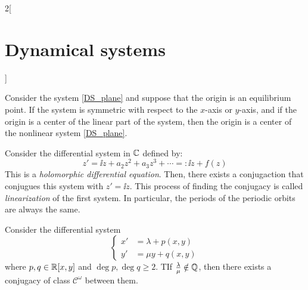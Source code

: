 \documentclass[../../../main_math.tex]{subfiles}
\begin{document}
\begin{multicols}{2}[\section{Dynamical systems}]
  \begin{theorem}
    Consider the system \cref{DS_plane} and suppose that the origin is an equilibrium point. If the system is symmetric with respect to the $x$-axis or $y$-axis, and if the origin is a center of the linear part of the system, then the origin is a center of the nonlinear system \cref{DS_plane}.
  \end{theorem}
  \begin{theorem}
    Consider the differential system in $\mathbb{C}$ defined by:
    $$z'=\ii z+ a_2z^2+a_3z^3+\cdots=:\ii z+f(z)$$ This is a \emph{holomorphic differential equation}. Then, there exists a conjugaction that conjugues this system with $z'=\ii z$. This process of finding the conjugacy is called \emph{linearization} of the first system. In particular, the periods of the periodic orbits are always the same.
  \end{theorem}
  \begin{theorem}
    Consider the differential system
    $$
      \left\{
      \begin{aligned}
        {x}' & = \lambda + p(x,y) \\
        {y}' & = \mu y+ q(x,y)
      \end{aligned}
      \right.
    $$
    where $p,q\in\mathbb{R}[x,y]$ and $\deg p,\deg q\geq 2$. TIf $\frac{\lambda}{\mu}\notin\mathbb{Q}$, then there exists a conjugacy of class $\mathcal{C}^\omega$ between them.
  \end{theorem}

\end{multicols}
\end{document}
